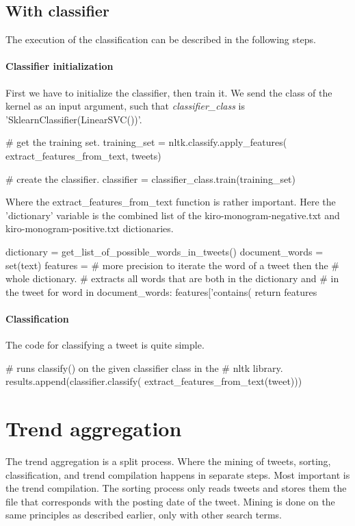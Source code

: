 \subsection{With classifier}
The execution of the classification can be described in the following steps. 

\paragraph{Classifier initialization}
First we have to initialize the classifier, then train it. We send the class of
the kernel as an input argument, such that \textit{classifier\_class} is
'SklearnClassifier(LinearSVC())'.
\begin{python}
# get the training set.
training_set = nltk.classify.apply_features(
    extract_features_from_text,
    tweets)

# create the classifier.
classifier = classifier_class.train(training_set)
\end{python}

Where the extract\_features\_from\_text function is rather important. Here the
'dictionary' variable is the combined list of the kiro-monogram-negative.txt and
kiro-monogram-positive.txt dictionaries.
\begin{python}
dictionary = get_list_of_possible_words_in_tweets()
document_words = set(text)
features = {}
# more precision to iterate the word of a tweet then the 
# whole dictionary.
# extracts all words that are both in the dictionary and 
# in the tweet
for word in document_words:
    features['contains(%
return features
\end{python}

\paragraph{Classification}
The code for classifying a tweet is quite simple. 
\begin{python}
# runs classify() on the given classifier class in the 
# nltk library.
results.append(classifier.classify(
    extract_features_from_text(tweet)))
\end{python}

\section{Trend aggregation}\label{code:trend_aggregation}
The trend aggregation is a split process. Where the mining of tweets, sorting,
classification, and trend compilation happens in separate steps. Most important
is the trend compilation. The sorting process only reads tweets
and stores them the file that corresponds with the posting date of the tweet.
Mining is done on the same principles as described earlier, only with other
search terms. 

